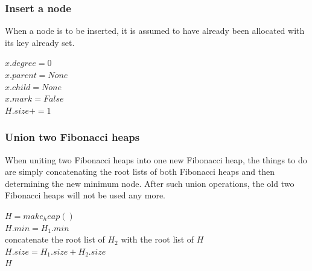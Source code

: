 \documentclass[catalog.tex]{subfiles}
\begin{document}
\subsubsection*{Insert a node}
\par When a node is to be inserted, it is assumed to have already been allocated with its key already set.
\begin{Algorithm}[Insert($x$)\label{alg:\currfilebase_insert}]
	$x.degree=0$ \\
	$x.parent=None$ \\
	$x.child=None$ \\
	$x.mark=False$ \\
	$H.size +=1$
\end{Algorithm}
\subsubsection*{Union two Fibonacci heaps}
\par When uniting two Fibonacci heaps into one new Fibonacci heap, the things to do are simply concatenating the root lists of both Fibonacci heaps and then determining the new minimum node. After such union operations, the old two Fibonacci heaps will not be used any more. 
\begin{Algorithm}[Union($H_1,H_2$)\label{alg:\currfilebase_union}]
	$H=make_heap()$ \\
	$H.min=H_1.min$ \\
	concatenate the root list of $H_2$ with the root list of $H$ \\
	$H.size=H_1.size+H_2.size$ \\
	\Ret $H$
\end{Algorithm}
\newpage
\end{document}
